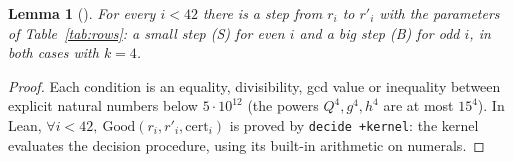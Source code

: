 \documentclass[11pt]{amsart}
\theoremstyle{plain}
\newtheorem{lemma}[theorem]{Lemma}
\theoremstyle{definition}
\begin{document}
\begin{lemma}[]\label{lem:table}
For every $i<42$ there is a step from $r_i$ to $r'_i$ with the parameters of Table~\ref{tab:rows}: a small step (S) for even $i$ and a big step (B) for odd $i$, in both cases with $k=4$.
\end{lemma}

\begin{proof}
Each condition is an equality, divisibility, gcd value or inequality between explicit natural numbers below $5\cdot10^{12}$ (the powers $Q^4,g^4,h^4$ are at most $15^4$). In Lean, $\forall i<42,\ \mathrm{Good}(r_i,r'_i,\mathrm{cert}_i)$ is proved by \texttt{decide +kernel}: the kernel evaluates the decision procedure, using its built-in arithmetic on numerals.
\end{proof}
\end{document}
